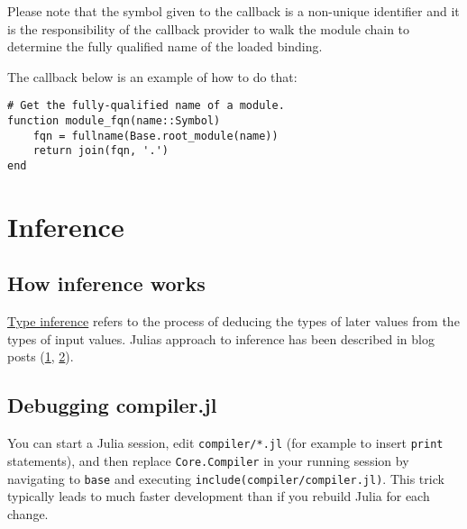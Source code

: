 Please note that the symbol given to the callback is a non-unique identifier and it is the responsibility of the callback provider to walk the module chain to determine the fully qualified name of the loaded binding.



The callback below is an example of how to do that:




\begin{verbatim}
# Get the fully-qualified name of a module.
function module_fqn(name::Symbol)
    fqn = fullname(Base.root_module(name))
    return join(fqn, '.')
end
\end{verbatim}



\hypertarget{582051353723326392}{}


\section{Inference}



\hypertarget{7885214660101366687}{}


\subsection{How inference works}



\href{https://en.wikipedia.org/wiki/Type\_inference}{Type inference} refers to the process of deducing the types of later values from the types of input values. Julia{\textquotesingle}s approach to inference has been described in blog posts (\href{https://juliacomputing.com/blog/2016/04/inference-convergence/}{1}, \href{https://juliacomputing.com/blog/2017/05/inference-converage2/}{2}).



\hypertarget{5858996762602267783}{}


\subsection{Debugging compiler.jl}



You can start a Julia session, edit \texttt{compiler/*.jl} (for example to insert \texttt{print} statements), and then replace \texttt{Core.Compiler} in your running session by navigating to \texttt{base} and executing \texttt{include({\textquotedbl}compiler/compiler.jl{\textquotedbl})}. This trick typically leads to much faster development than if you rebuild Julia for each change.



